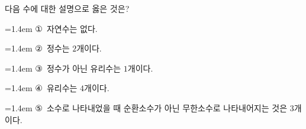 다음 수에 대한 설명으로 옳은 것은?
\par\medskip\par\noindent\hangindent=1.4em {\small ①}\ 자연수는 없다.\par\noindent\hangindent=1.4em {\small ②}\ 정수는 $2$개이다.\par\noindent\hangindent=1.4em {\small ③}\ 정수가 아닌 유리수는 $1$개이다.\par\noindent\hangindent=1.4em {\small ④}\ 유리수는 $4$개이다.\par\noindent\hangindent=1.4em {\small ⑤}\ 소수로 나타내었을 때 순환소수가 아닌 무한소수로 나타내어지는 것은 $3$개이다.\par\medskip
